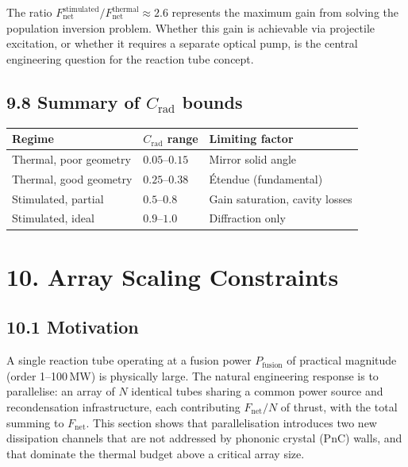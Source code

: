 \documentclass[12pt]{article}
\begin{document}
The ratio $F_{\mathrm{net}}^{\mathrm{stimulated}} / F_{\mathrm{net}}^{\mathrm{thermal}}
\approx 2.6$ represents the maximum gain from solving the population inversion
problem. Whether this gain is achievable via projectile excitation, or whether
it requires a separate optical pump, is the central engineering question for
the reaction tube concept.

\subsection*{9.8 Summary of $C_{\mathrm{rad}}$ bounds}

\begin{center}
\begin{tabular}{lll}
\toprule
\textbf{Regime} & \textbf{$C_{\mathrm{rad}}$ range} & \textbf{Limiting factor} \\
\midrule
Thermal, poor geometry    & $0.05$--$0.15$ & Mirror solid angle \\
Thermal, good geometry    & $0.25$--$0.38$ & \'{E}tendue (fundamental) \\
Stimulated, partial       & $0.5$--$0.8$   & Gain saturation, cavity losses \\
Stimulated, ideal         & $0.9$--$1.0$   & Diffraction only \\
\bottomrule
\end{tabular}
\end{center}


\section*{10. Array Scaling Constraints}

\subsection*{10.1 Motivation}

A single reaction tube operating at a fusion power $P_{\mathrm{fusion}}$ of
practical magnitude (order 1--100\,MW) is physically large. The natural
engineering response is to parallelise: an array of $N$ identical tubes sharing
a common power source and recondensation infrastructure, each contributing
$F_{\mathrm{net}}/N$ of thrust, with the total summing to $F_{\mathrm{net}}$.
This section shows that parallelisation introduces two new dissipation channels
that are not addressed by phononic crystal (PnC) walls, and that dominate the
thermal budget above a critical array size.
\end{document}
